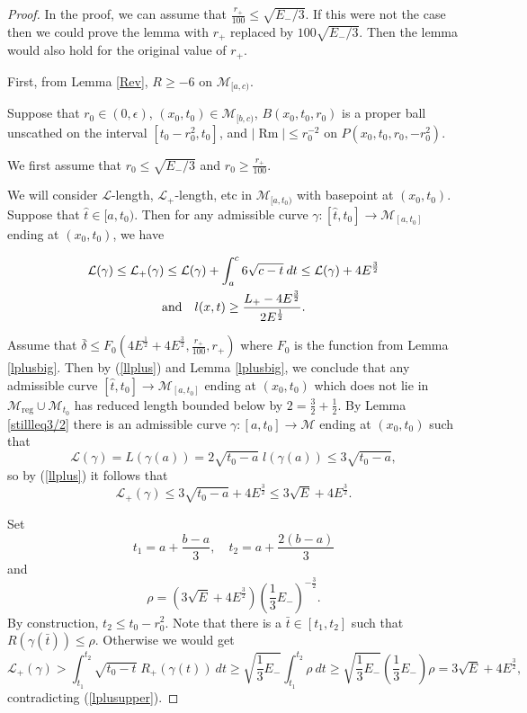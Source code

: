 \documentclass[12pt]{amsart}
\renewcommand{\L}{{\mathcal L}}
\newcommand{\M}{{\mathcal M}}
\newcommand{\reg}{\operatorname{reg}}
\newcommand{\Rm}{\operatorname{Rm}}
\newcommand{\de}{\delta}
\newcommand{\eps}{\epsilon}
\newcommand{\ga}{\gamma}
\newcommand{\ra}{\rightarrow}
\numberwithin{equation}{section}
\theoremstyle{plain}
\theoremstyle{definition}
\theoremstyle{remark}
\begin{document}
\begin{proof}
In the proof, we can assume that $\frac{r_+}{100} \le \sqrt{E_-/3}$.
If this were not the case then we could prove the lemma with
$r_+$ replaced by $100 \sqrt{E_-/3}$. Then the lemma would 
also hold for the original value of $r_+$.

First, from Lemma \ref{Rev}, $R \ge -6$ on
$\M_{[a,c)}$.

Suppose that $r_0\in (0,\eps)$,  $(x_0,t_0)\in\M_{[b,c)}$,
  $B(x_0,t_0,r_0)$
is a proper ball  unscathed on the interval $[t_0-r_0^2,t_0]$, and
$|\Rm|\leq r_0^{-2}$ on $P(x_0,t_0,r_0,-r_0^2)$.


We first assume that 
$r_0\leq \sqrt{E_-/3}$
and $r_0\geq \frac{r_+}{100}$.


We will consider $\L$-length, $\L_+$-length, etc in 
$\M_{[a,t_0)}$ with basepoint at $(x_0,t_0)$. Suppose that 
$\widehat{t} \in [a,t_0)$. 
Then for any admissible curve 
$\ga:[\widehat{t},t_0]\ra \M_{[a,t_0]}$
ending at $(x_0,t_0)$, we have

\begin{gather}
\label{llplus}
\L(\ga)\leq \L_+(\ga)\leq \L(\ga)+\int_a^c6\sqrt{c-t}\: dt
\leq \L(\ga)+4E^{\frac32} \\
\mbox{and}\quad l(x,t)\geq\frac{L_+-4E^{\frac32}}{2E^{\frac12}}. \notag
\end{gather}

Assume that $\bar\de\leq F_0(4E^{\frac12}+4E^{\frac32},\frac{r_+}{100},r_+)$
where $F_0$ is the function from Lemma \ref{lplusbig}.
Then by (\ref{llplus}) and Lemma \ref{lplusbig},
we conclude that any admissible
curve 
$[\widehat{t},t_0]\ra \M_{[a,t_0]}$
ending at $(x_0,t_0)$
which does not lie in $\M_{\reg}\cup \M_{t_0}$
has reduced length bounded below by $2=\frac32+\frac12$.  By Lemma 
\ref{stillleq3/2} there is an admissible curve $\ga:[a,t_0]\ra\M$
ending at $(x_0,t_0)$ such that
\begin{equation}
\L(\ga)=L(\ga(a))=2\sqrt{t_0-a}\;l(\ga(a))\leq 3\sqrt{t_0-a},
\end{equation} 
so by (\ref{llplus}) it follows that
\begin{equation}
\label{lplusupper}
\L_+(\ga)\leq 3\sqrt{t_0-a}+4E^{\frac32}\leq 3\sqrt{E}+4E^{\frac32}.
\end{equation}


Set 
\begin{equation}
t_1= a+\frac{b-a}{3},\quad t_2= a+\frac{2(b-a)}{3}
\end{equation}
and
\begin{equation}
\rho= \left(3\sqrt{E}+4E^{\frac32}\right)
\left(\frac13 E_-\right)^{-\frac32}.
\end{equation}
By construction, $t_2 \le t_0 - r_0^2$.
Note that there is a $\bar t\in [t_1,t_2]$ such that
$R(\ga(\bar t))\leq \rho$.
Otherwise we would get
\begin{equation}
\L_+(\ga) > \int_{t_1}^{t_2}\sqrt{t_0-t}\;R_+(\ga(t)) \: dt
\geq \sqrt{\frac13 E_-}\int_{t_1}^{t_2}\rho \: dt
\geq \sqrt{\frac13 E_-}\left(\frac13 E_-\right)\rho=3\sqrt{E}+4E^{\frac32},
\end{equation}
contradicting (\ref{lplusupper}).


\end{proof}
\end{document}
